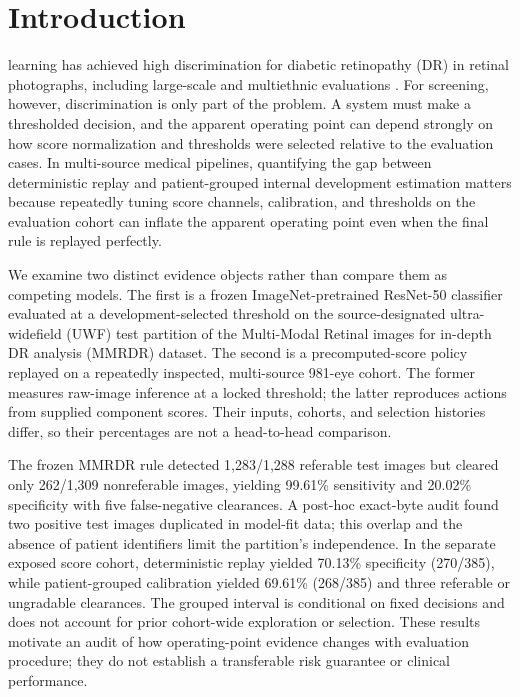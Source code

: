 \documentclass{ieeeaccess}
\begin{document}
\section{Introduction}
 learning has achieved high discrimination for diabetic retinopathy (DR) in retinal photographs, including large-scale and multiethnic evaluations \cite{gulshan2016,ting2017,abramoff2018,bellemo2019}. For screening, however, discrimination is only part of the problem. A system must make a thresholded decision, and the apparent operating point can depend strongly on how score normalization and thresholds were selected relative to the evaluation cases. In multi-source medical pipelines, quantifying the gap between deterministic replay and patient-grouped internal development estimation matters because repeatedly tuning score channels, calibration, and thresholds on the evaluation cohort can inflate the apparent operating point even when the final rule is replayed perfectly.

We examine two distinct evidence objects rather than compare them as competing models. The first is a frozen ImageNet-pretrained ResNet-50 classifier evaluated at a development-selected threshold on the source-designated ultra-widefield (UWF) test partition of the Multi-Modal Retinal images for in-depth DR analysis (MMRDR) dataset. The second is a precomputed-score policy replayed on a repeatedly inspected, multi-source 981-eye cohort. The former measures raw-image inference at a locked threshold; the latter reproduces actions from supplied component scores. Their inputs, cohorts, and selection histories differ, so their percentages are not a head-to-head comparison.

The frozen MMRDR rule detected 1,283/1,288 referable test images but cleared only 262/1,309 nonreferable images, yielding 99.61\% sensitivity and 20.02\% specificity with five false-negative clearances. A post-hoc exact-byte audit found two positive test images duplicated in model-fit data; this overlap and the absence of patient identifiers limit the partition's independence. In the separate exposed score cohort, deterministic replay yielded 70.13\% specificity (270/385), while patient-grouped calibration yielded 69.61\% (268/385) and three referable or ungradable clearances. The grouped interval is conditional on fixed decisions and does not account for prior cohort-wide exploration or selection. These results motivate an audit of how operating-point evidence changes with evaluation procedure; they do not establish a transferable risk guarantee or clinical performance.
\end{document}
